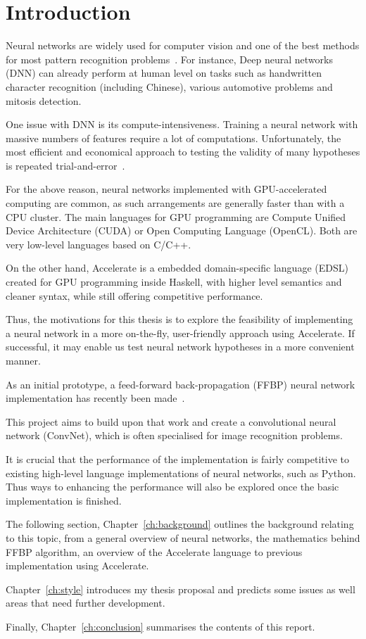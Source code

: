 \chapter{Introduction}\label{ch:intro}

Neural networks are widely used for computer vision and one of the best methods for most pattern recognition problems~\cite{Nvi14}. For instance, Deep neural networks (DNN) can already perform at human level on tasks such as handwritten character recognition (including Chinese), various automotive problems and mitosis detection.

One issue with DNN is its compute-intensiveness. Training a neural network with massive numbers of features require a lot of computations. Unfortunately, the most efficient and economical approach to testing the validity of many hypotheses is repeated trial-and-error~\cite{Ng12}.

For the above reason, neural networks implemented with GPU-accelerated computing are common, as such arrangements are generally faster than with a CPU cluster. The main languages for GPU programming are Compute Unified Device Architecture (CUDA) or Open Computing Language (OpenCL). Both are very low-level languages based on C/C++. 

On the other hand, Accelerate is a embedded domain-specific language (EDSL) created for GPU programming inside Haskell, with higher level semantics and cleaner syntax, while still offering competitive performance. 

Thus, the motivations for this thesis is to explore the feasibility of implementing a neural network in a more on-the-fly, user-friendly approach using Accelerate. If successful, it may enable us test neural network hypotheses in a more convenient manner. 

As an initial prototype, a feed-forward back-propagation (FFBP) neural network implementation has recently been made~\cite{Eve16}. 


This project aims to build upon that work and create a convolutional neural network (ConvNet), which is often specialised for image recognition problems.

It is crucial that the performance of the implementation is fairly competitive to existing high-level language implementations of neural networks, such as Python. Thus ways to enhancing the performance will also be explored once the basic implementation is finished.


The following section, Chapter~\ref{ch:background} outlines the background relating to this topic, from a general overview of neural networks, the mathematics behind FFBP algorithm, an overview of the Accelerate language to previous implementation using Accelerate.

Chapter~\ref{ch:style} introduces my thesis proposal and predicts some issues as well areas that need further development.

Finally, Chapter~\ref{ch:conclusion} summarises the contents of this report.
